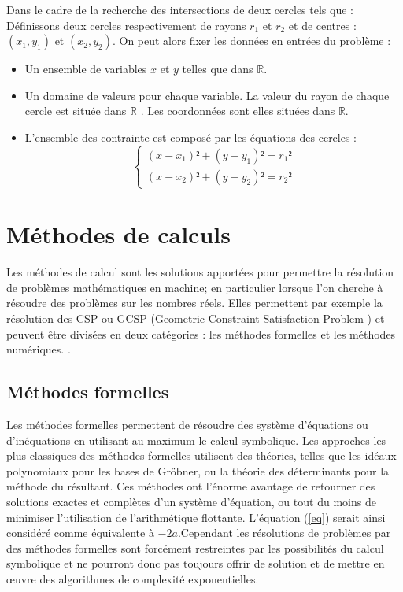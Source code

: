 Dans le cadre de la recherche des intersections de deux cercles tels que : 
Définissons deux cercles respectivement de rayons  $r_1$ et $r_2$ et de centres : $(x_1,y_1)$ et $(x_2,y_2)$.
On peut alors fixer les données en entrées du problème :
\begin{itemize}
\item
Un ensemble de variables $x$ et $y$ telles que  dans $\mathbb{R}$.
\item
Un domaine de valeurs pour chaque variable. La valeur du rayon de chaque cercle est située dans  $\mathbb{R⁺}$. Les coordonnées sont elles situées dans  $\mathbb{R}$.
\item
L'ensemble des contrainte est composé par les équations des cercles :
\begin{equation*}
\begin{cases}
(x-x_1)²+(y-y_1)² = r_1²\\
(x-x_2)²+(y-y_2)² = r_2²
\end{cases}
\end{equation*}

\end{itemize}



\section{Méthodes de calculs}
Les méthodes de calcul sont les solutions apportées pour permettre la résolution de problèmes mathématiques en machine; en particulier lorsque l'on cherche à résoudre des problèmes sur les nombres réels. Elles permettent par exemple la résolution des CSP  ou GCSP (Geometric Constraint Satisfaction Problem \cite{Jermann}) et peuvent être divisées en deux catégories : les méthodes formelles et les méthodes numériques. . 


\subsection{Méthodes formelles}
Les méthodes formelles permettent de résoudre des système d'équations ou d'inéquations en utilisant au maximum le calcul symbolique. Les approches les plus classiques des méthodes formelles utilisent des théories, telles que les idéaux polynomiaux pour les bases de Gröbner, ou la théorie des déterminants pour la méthode du résultant. Ces méthodes ont l'énorme avantage de retourner des solutions exactes et complètes d'un système d'équation, ou tout du moins de minimiser l'utilisation de l'arithmétique flottante. L'équation (\ref{eq}) serait ainsi considéré comme équivalente à $-2a$.Cependant les résolutions de problèmes par des méthodes formelles sont forcément restreintes par les possibilités du calcul symbolique et ne pourront donc pas toujours offrir de solution et  de mettre en œuvre des algorithmes de complexité exponentielles.



